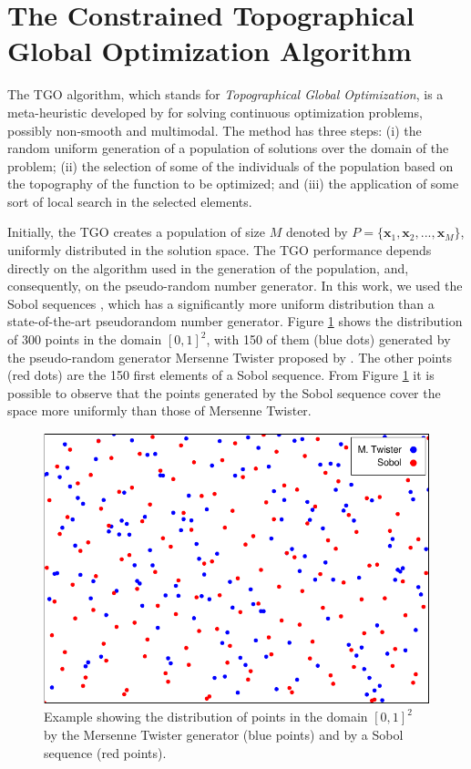 \section{The Constrained Topographical Global Optimization Algorithm}\label{sec:Methods}

The TGO algorithm, which stands for \textit{Topographical Global Optimization}, is a meta-heuristic developed by \cite{ITGO1} for solving continuous optimization problems, possibly non-smooth and multimodal. The method has three steps: (i) the random uniform generation of a population of solutions over the domain of the problem; (ii) the selection of some of the individuals of the population based on the topography of the function to be optimized; and (iii) the application of some sort of local search in the selected elements.

Initially, the TGO creates a population of size $M$ denoted by $P = \{\bm{x}_1, \bm{x}_2, ..., \allowbreak \bm{x}_M\}$, uniformly distributed in the solution space. The TGO performance depends directly on the algorithm used in the generation of the population, and, consequently, on the pseudo-random number generator. In this work, we used the Sobol sequences \citep{Sobol, ITGO3}, which has a significantly more uniform distribution than a state-of-the-art pseudorandom number generator. Figure \ref{fig:Sobol} shows the distribution of 300 points in the domain $[0, 1]^2$, with 150 of them (blue dots) generated by the pseudo-random generator Mersenne Twister proposed by \cite{mt19937}. The other points (red dots) are the 150 first elements of a Sobol sequence. From Figure \ref{fig:Sobol} it is possible to observe that the points generated by the Sobol sequence cover the space more uniformly than those of Mersenne Twister.


\begin{figure}[h]
\begin{center}
\includegraphics[scale=0.8]{img/Sobol/scatter-crop}
\end{center}
\captionsetup{justification=centering}
\caption{Example showing the distribution of points in the domain $[0, 1]^2$ by the Mersenne Twister generator (blue points) and by a Sobol sequence (red points). }\label{fig:Sobol}
\end{figure}


